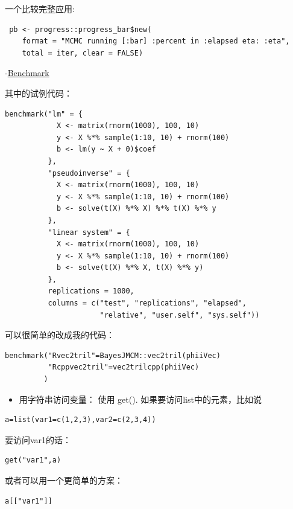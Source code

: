 \documentclass[
]{book}
\providecommand{\tightlist}{%
  \setlength{\itemsep}{0pt}\setlength{\parskip}{0pt}}
\theoremstyle{definition}
\theoremstyle{definition}
\theoremstyle{definition}
\theoremstyle{remark}
\begin{document}
一个比较完整应用:

\begin{verbatim}
 pb <- progress::progress_bar$new(
    format = "MCMC running [:bar] :percent in :elapsed eta: :eta",
    total = iter, clear = FALSE)
\end{verbatim}

-\href{https://www.alexejgossmann.com/benchmarking_r/}{Benchmark}

其中的试例代码：

\begin{verbatim}
benchmark("lm" = {
            X <- matrix(rnorm(1000), 100, 10)
            y <- X %*% sample(1:10, 10) + rnorm(100)
            b <- lm(y ~ X + 0)$coef
          },
          "pseudoinverse" = {
            X <- matrix(rnorm(1000), 100, 10)
            y <- X %*% sample(1:10, 10) + rnorm(100)
            b <- solve(t(X) %*% X) %*% t(X) %*% y
          },
          "linear system" = {
            X <- matrix(rnorm(1000), 100, 10)
            y <- X %*% sample(1:10, 10) + rnorm(100)
            b <- solve(t(X) %*% X, t(X) %*% y)
          },
          replications = 1000,
          columns = c("test", "replications", "elapsed",
                      "relative", "user.self", "sys.self"))
\end{verbatim}

可以很简单的改成我的代码：

\begin{verbatim}
benchmark("Rvec2tril"=BayesJMCM::vec2tril(phiiVec)
          "Rcppvec2tril"=vec2trilcpp(phiiVec)
         )
\end{verbatim}

\begin{itemize}
\tightlist
\item
  用字符串访问变量：
  使用 get().
  如果要访问list中的元素，比如说
\end{itemize}

\begin{verbatim}
a=list(var1=c(1,2,3),var2=c(2,3,4))
\end{verbatim}

要访问var1的话：

\begin{verbatim}
get("var1",a)
\end{verbatim}

或者可以用一个更简单的方案：

\begin{verbatim}
a[["var1"]]
\end{verbatim}
\end{document}
